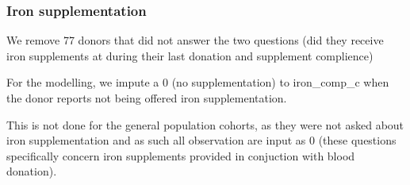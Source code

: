 \documentclass[
]{article}
\newenvironment{Shaded}{\begin{snugshade}}{\end{snugshade}}
\newcommand{\DecValTok}[1]{\textcolor[rgb]{0.00,0.00,0.81}{#1}}
\newcommand{\FunctionTok}[1]{\textcolor[rgb]{0.00,0.00,0.00}{#1}}
\newcommand{\NormalTok}[1]{#1}
\newcommand{\OtherTok}[1]{\textcolor[rgb]{0.56,0.35,0.01}{#1}}
\newcommand{\SpecialCharTok}[1]{\textcolor[rgb]{0.00,0.00,0.00}{#1}}
\newcommand{\StringTok}[1]{\textcolor[rgb]{0.31,0.60,0.02}{#1}}
\begin{document}
\begin{Shaded}
\end{Shaded}

\hypertarget{iron-supplementation}{%
\subsubsection{Iron supplementation}\label{iron-supplementation}}

We remove 77 donors that did not answer the two questions (did they
receive iron supplements at during their last donation and supplement
complience)

For the modelling, we impute a 0 (no supplementation) to iron\_comp\_c
when the donor reports not being offered iron supplementation.

This is not done for the general population cohorts, as they were not
asked about iron supplementation and as such all observation are input
as 0 (these questions specifically concern iron supplements provided in
conjuction with blood donation).
\end{document}
